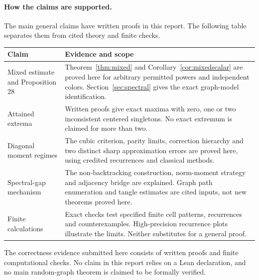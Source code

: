 \documentclass[11pt]{article}
\theoremstyle{definition}
\theoremstyle{remark}
\newcommand{\1}{\mathbf 1}
\begin{document}
\paragraph{How the claims are supported.}
The main general claims have written proofs in this report. The following table separates them from cited theory and finite checks.

\begin{center}
\small
\begin{tabular}{p{}p{}}
\toprule
Claim & Evidence and scope\\
\midrule
Mixed estimate and Proposition 28 & Theorem~\ref{thm:mixed} and Corollary~\ref{cor:mixedscalar} are proved here for arbitrary permitted powers and independent colors. Section~\ref{sec:spectral} gives the exact graph-model identification.\\[4pt]
Attained extrema & Written proofs give exact maxima with zero, one or two inconsistent centered singletons. No exact extremum is claimed for more than two.\\[4pt]
Diagonal moment regimes & The cubic criterion, parity limits, correction hierarchy and two distinct sharp approximation errors are proved here, using credited recurrences and classical methods.\\[4pt]
Spectral-gap mechanism & The non-backtracking construction, norm-moment strategy and adjacency bridge are explained. Graph path enumeration and tangle estimates are cited inputs, not new theorems proved here.\\[4pt]
Finite calculations & Exact checks test specified finite cell patterns, recurrences and counterexamples. High-precision recurrence plots illustrate the limits. Neither substitutes for a general proof.\\
\bottomrule
\end{tabular}
\end{center}

The correctness evidence submitted here consists of written proofs and finite computational checks. No claim in this report relies on a Lean declaration, and no main random-graph theorem is claimed to be formally verified.
\end{document}
